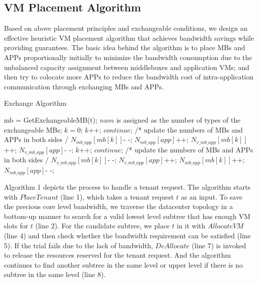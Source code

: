 \documentclass[review]{elsarticle}
\begin{document}
\subsection{VM Placement Algorithm}

Based on above placement principles and exchangeable conditions, we design an effective heuristic VM placement algorithm that achieves bandwidth savings while providing guarantees. The basic idea behind the algorithm is to place MBs and APPs proportionally initially to minimize the bandwidth consumption due to the unbalanced capacity assignment between middleboxes and application VMs; and then try to colocate more APPs to reduce the bandwidth cost of intra-application communication through exchanging MBs and APPs. 




 


\begin{algorithm}[H]%
	\caption{Exchange Algorithm}
	\begin{algorithmic}[1]
		\State mb = GetExchangeableMB(t);
		\State $num$ is assigned as the number of types
		\State of the exchangeable MBs;
		\State $k = 0$;
		\State $k$++; $continue$;
		\EndIf
		\State /* update the numbers of MBs
		\State and APPs in both sides \quad \quad*/
		\State $N_{mb\_app}[mb[k]]$- -; $N_{mb\_app}[app]$++;
		\State $N_{v\_mb\_app}[mb[k]]$++; $N_{v\_mb\_app}[app]$- -;
		\EndWhile
		\Else
		\While{$k<num \quad and \quad N_{mb\_app}!=0$}
		\If {$N_{v\_mb\_app}[mb[k]]==0$}
		\State $k$++; $continue$;
		\EndIf
		\State /* update the numbers of MBs
		\State and APPs in both sides \quad \quad*/
		\State $N_{v\_mb\_app}[mb[k]]$- -; $N_{v\_mb\_app}[app]$++;
		\State $N_{mb\_app}[mb[k]]$++; $N_{mb\_app}[app]$- -;
		\EndWhile
		\EndIf
		\EndIf
		\EndFunction    
	\end{algorithmic}
	
\end{algorithm}		

Algorithm 1 depicts the process to handle a tenant request. The algorithm starts with $PlaceTenant$ (line 1), which takes a tenant request $t$ as an input. To save the precious core level bandwidth, we traverse the datacenter topology in a bottom-up manner to search for a valid lowest level subtree that has enough VM slots for $t$ (line 2). For the candidate subtree, we place $t$ in it with $AllocateVM$ (line 4) and then check whether the bandwidth requirement can be satisfied (line 5). If the trial fails due to the lack of bandwidth, $DeAllocate$ (line 7) is invoked to release the resources reserved for the tenant request. And the algorithm continues to find another subtree in the same level or upper level if there is no subtree in the same level (line 8). 
\end{document}
